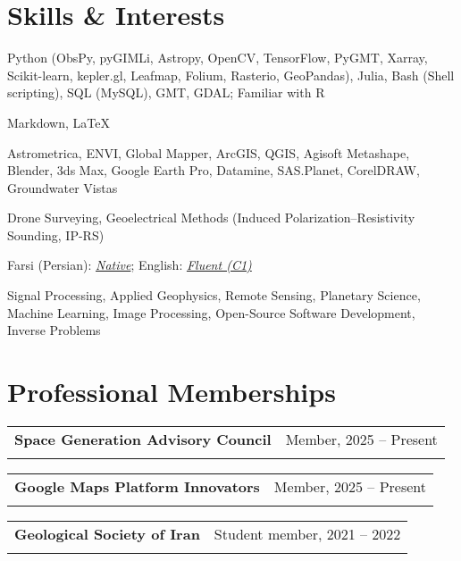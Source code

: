 \documentclass[letterpaper,11pt]{article}
\makeatletter
\newcommand{\ressubheading}[4]{%
	\begin{tabular*}{\textwidth}{l@{\cftdotfill{\cftsecdotsep}\extracolsep{\fill}}r}
		\textbf{#1} & #2 \\
		\textit{#3} & \textit{#4} \\
	\end{tabular*}\vspace{-8pt}
}
\makeatother
\begin{document}
		\section{Skills \& Interests}
		\vspace{-0.7em}
		\begin{description}[itemsep=0pt]
			
			\item[Programming Languages:] 
			Python (ObsPy, pyGIMLi, Astropy, OpenCV, TensorFlow, PyGMT, Xarray, Scikit-learn, kepler.gl, Leafmap, Folium, Rasterio, GeoPandas), Julia, Bash (Shell scripting), SQL (MySQL), GMT, GDAL; Familiar with R
			
			\item[Markup Languages:] 
			Markdown, \LaTeX
			
			\item[Softwares:] 
			Astrometrica, ENVI, Global Mapper, ArcGIS, QGIS, Agisoft Metashape, Blender, 3ds Max, Google Earth Pro, Datamine, SAS.Planet, CorelDRAW, Groundwater Vistas
			
			\item[Field Techniques:] 
			Drone Surveying, Geoelectrical Methods (Induced Polarization–Resistivity Sounding, IP-RS)
			
			\item[Languages:] 
			Farsi (Persian): \textit{\underline{Native}}; English: \textit{\underline{Fluent (C1)}}
			
			\item[Research Interests:] 
			Signal Processing, Applied Geophysics, Remote Sensing, Planetary Science, Machine Learning, Image Processing, Open-Source Software Development, Inverse Problems
			
		\end{description}
		\vspace{-2.3em} 
		\section{Professional Memberships}
		\vspace{-0.2em}
		\vspace{-0.5em} 
		\ressubheading{Space Generation Advisory Council}{Member, 2025 – Present}{}{}
		\vspace{-0.2em} 
		\vspace{-0.5em} 
		\ressubheading{Google Maps Platform Innovators}{Member, 2025 – Present}{}{}
		\vspace{-0.2em} 
		\vspace{-0.5em} 
		\ressubheading{Geological Society of Iran}{Student member, 2021 – 2022}{}{}
		\vspace{2em} 
		
	
\end{document}
